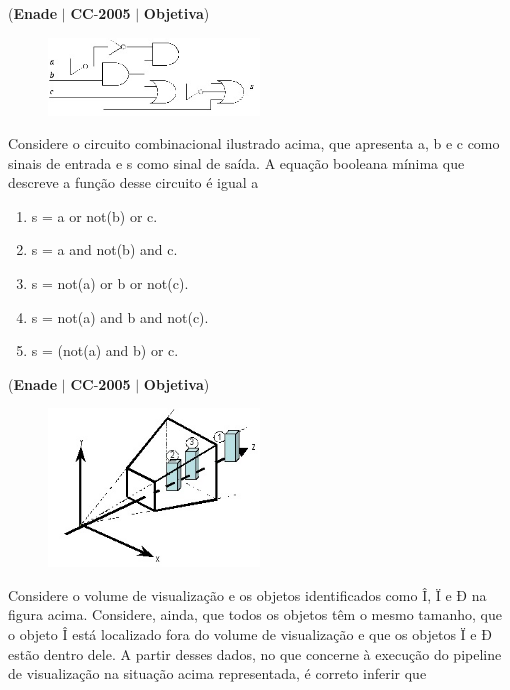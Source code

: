 \documentclass{exam}
\begin{document}
\begin{questions}
\question (\textbf{Enade} $|$ \textbf{CC}-\textbf{2005} $|$ \textbf{Objetiva})


\begin{figure}[H]
	\begin{center}
		\includegraphics[width=0.5\textwidth]{CIENCIA_DA_COMPUTACAO_Prova2005-utf8_figuras/fig-0029.jpg}
	\end{center}
\end{figure}

Considere o circuito combinacional ilustrado acima, que apresenta
a, b e c como sinais de entrada e s como sinal de saída. A equação
booleana mínima que descreve a função desse circuito é igual a
	\begin{enumerate}[label=\alph*)]
		\item  s = a or not(b) or c.
		\item  s = a and not(b) and c.
		\item  s = not(a) or b or not(c).
		\item  s = not(a) and b and not(c).
		\item  s = (not(a) and b) or c.
	\end{enumerate}

\question (\textbf{Enade} $|$ \textbf{CC}-\textbf{2005} $|$ \textbf{Objetiva})

\begin{figure}[H]
	\begin{center}
		\includegraphics[width=0.5\textwidth]{CIENCIA_DA_COMPUTACAO_Prova2005-utf8_figuras/fig-0030.jpg}
	\end{center}
\end{figure}
Considere o volume de visualização e os objetos identificados
como Î, Ï e Ð na figura acima. Considere, ainda, que todos os
objetos têm o mesmo tamanho, que o objeto Î está localizado fora
do volume de visualização e que os objetos Ï e Ð estão dentro
dele. A partir desses dados, no que concerne à execução do
pipeline de visualização na situação acima representada, é correto
inferir que


\end{questions}
\end{document}
